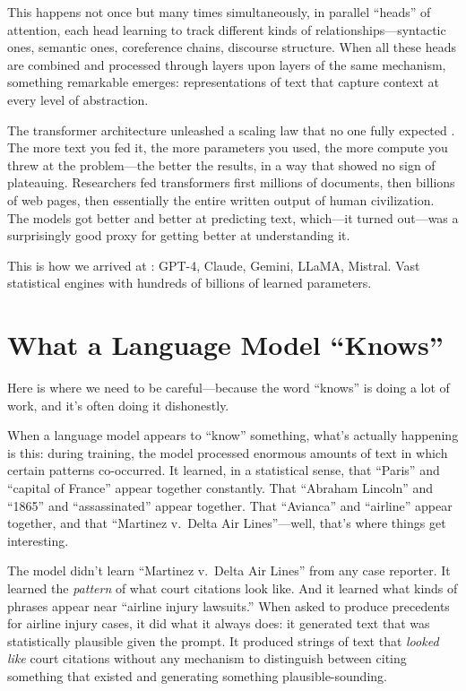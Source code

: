This happens not once but many times simultaneously, in parallel ``heads'' of attention, each head learning to track different kinds of relationships---syntactic ones, semantic ones, coreference chains, discourse structure. When all these heads are combined and processed through layers upon layers of the same mechanism, something remarkable emerges: representations of text that capture context at every level of abstraction.

The transformer architecture unleashed a scaling law that no one fully expected \autocite{kaplan2020scaling}. The more text you fed it, the more parameters you used, the more compute you threw at the problem---the better the results, in a way that showed no sign of plateauing. Researchers fed transformers first millions of documents, then billions of web pages, then essentially the entire written output of human civilization. The models got better and better at predicting text, which---it turned out---was a surprisingly good proxy for getting better at understanding it.

This is how we arrived at : GPT-4, Claude, Gemini, LLaMA, Mistral. Vast statistical engines with hundreds of billions of learned parameters.

\section{What a Language Model ``Knows''}
\label{sec:what-llm-knows}

Here is where we need to be careful---because the word ``knows'' is doing a lot of work, and it's often doing it dishonestly.

When a language model appears to ``know'' something, what's actually happening is this: during training, the model processed enormous amounts of text in which certain patterns co-occurred. It learned, in a statistical sense, that ``Paris'' and ``capital of France'' appear together constantly. That ``Abraham Lincoln'' and ``1865'' and ``assassinated'' appear together. That ``Avianca'' and ``airline'' appear together, and that ``Martinez v.\ Delta Air Lines''---well, that's where things get interesting.

The model didn't learn ``Martinez v.\ Delta Air Lines'' from any case reporter. It learned the \emph{pattern} of what court citations look like. And it learned what kinds of phrases appear near ``airline injury lawsuits.'' When asked to produce precedents for airline injury cases, it did what it always does: it generated text that was statistically plausible given the prompt. It produced strings of text that \emph{looked like} court citations without any mechanism to distinguish between citing something that existed and generating something plausible-sounding.

